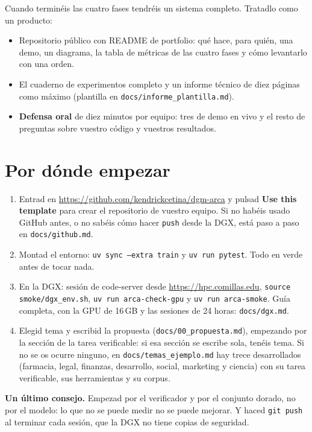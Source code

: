 \documentclass[11pt,a4paper]{article}
\newcommand{\code}[1]{{\small\texttt{#1}}}
\newcommand{\file}[1]{{\small\texttt{\textcolor{arcablue}{#1}}}}
\begin{document}
Cuando terminéis las cuatro fases tendréis un sistema completo. Tratadlo como un producto:

\begin{itemize}
  \item Repositorio público con README de portfolio: qué hace, para quién, una demo, un
  diagrama, la tabla de métricas de las cuatro fases y cómo levantarlo con una orden.
  \item El cuaderno de experimentos completo y un informe técnico de diez páginas como máximo
  (plantilla en \file{docs/informe\_plantilla.md}).
  \item \textbf{Defensa oral} de diez minutos por equipo: tres de demo en vivo y el resto de
  preguntas sobre vuestro código y vuestros resultados.
\end{itemize}

\section{Por dónde empezar}

\begin{enumerate}
  \item Entrad en \url{https://github.com/kendrickcetina/dgm-arca} y pulsad
  \textbf{Use this template} para crear el repositorio de vuestro equipo. Si no habéis usado
  GitHub antes, o no sabéis cómo hacer \code{push} desde la DGX, está paso a paso en
  \file{docs/github.md}.
  \item Montad el entorno: \code{uv sync --extra train} y \code{uv run pytest}. Todo en verde
  antes de tocar nada.
  \item En la DGX: sesión de code-server desde \url{https://hpc.comillas.edu},
  \code{source smoke/dgx\_env.sh}, \code{uv run arca-check-gpu} y \code{uv run arca-smoke}.
  Guía completa, con la GPU de 16\,GB y las sesiones de 24 horas: \file{docs/dgx.md}.
  \item Elegid tema y escribid la propuesta (\file{docs/00\_propuesta.md}), empezando por la
  sección de la tarea verificable: si esa sección se escribe sola, tenéis tema. Si no se os
  ocurre ninguno, en \file{docs/temas\_ejemplo.md} hay trece desarrollados (farmacia, legal,
  finanzas, desarrollo, social, marketing y ciencia) con su tarea verificable, sus
  herramientas y su corpus.
\end{enumerate}

\textbf{Un último consejo.} Empezad por el verificador y por el conjunto dorado, no por el
modelo: lo que no se puede medir no se puede mejorar. Y haced \code{git push} al terminar cada
sesión, que la DGX no tiene copias de seguridad.
\end{document}
